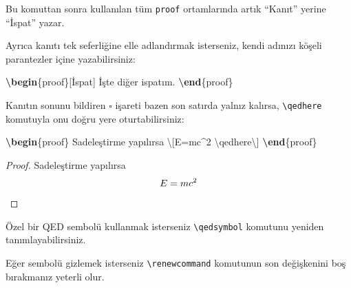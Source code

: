 \documentclass[
  10pt,
]{scrbook}
\newenvironment{Shaded}{\begin{snugshade}}{\end{snugshade}}
\newcommand{\ExtensionTok}[1]{#1}
\newcommand{\FunctionTok}[1]{\textcolor[rgb]{0.00,0.00,0.00}{#1}}
\newcommand{\KeywordTok}[1]{\textcolor[rgb]{0.13,0.29,0.53}{\textbf{#1}}}
\newcommand{\NormalTok}[1]{#1}
\newcommand{\SpecialCharTok}[1]{\textcolor[rgb]{0.00,0.00,0.00}{#1}}
\newcommand{\SpecialStringTok}[1]{\textcolor[rgb]{0.31,0.60,0.02}{#1}}
\theoremstyle{definition}
\theoremstyle{definition}
\theoremstyle{definition}
\theoremstyle{definition}
\theoremstyle{remark}
\begin{document}
Bu komuttan sonra kullanılan tüm \texttt{proof} ortamlarında artık ``Kanıt''
yerine ``İspat'' yazar.

Ayrıca kanıtı tek seferliğine elle adlandırmak isterseniz, kendi adınızı
köşeli parantezler içine yazabilirsiniz:

\begin{Shaded}
\begin{Highlighting}[]
\KeywordTok{\textbackslash{}begin}\NormalTok{\{}\ExtensionTok{proof}\NormalTok{\}[İspat]}
\NormalTok{ İşte diğer ispatım.}
\KeywordTok{\textbackslash{}end}\NormalTok{\{}\ExtensionTok{proof}\NormalTok{\}}
\end{Highlighting}
\end{Shaded}

Kanıtın sonunu bildiren \(\square\) işareti bazen son satırda yalnız
kalırsa, \texttt{\textbackslash{}qedhere} komutuyla onu doğru yere oturtabilirsiniz:

\begin{Shaded}
\begin{Highlighting}[]
\KeywordTok{\textbackslash{}begin}\NormalTok{\{}\ExtensionTok{proof}\NormalTok{\}}
\NormalTok{ Sadeleştirme yapılırsa }\SpecialStringTok{\textbackslash{}[E=mc\^{}2 }\SpecialCharTok{\textbackslash{}qedhere}\SpecialStringTok{\textbackslash{}]}
\KeywordTok{\textbackslash{}end}\NormalTok{\{}\ExtensionTok{proof}\NormalTok{\}}
\end{Highlighting}
\end{Shaded}

\begin{proof}
 Sadeleştirme yapılırsa \[E=mc^2 \qedhere\]
\end{proof}

Özel bir QED sembolü kullanmak isterseniz \texttt{\textbackslash{}qedsymbol} komutunu yeniden
tanımlayabilirsiniz.

\begin{Shaded}
\end{Shaded}

Eğer sembolü gizlemek isterseniz \texttt{\textbackslash{}renewcommand} komutunun son
değişkenini boş bırakmanız yeterli olur.
\end{document}
